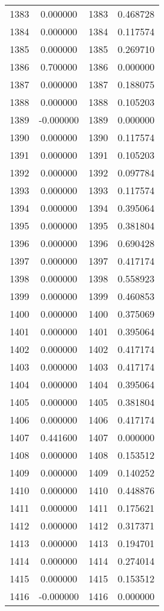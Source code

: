 \documentclass[12pt]{article}
\begin{document}
\begin{longtable}{@{}cccc@{}}
1383 & 0.000000 & 1383 & 0.468728 \\
1384 & 0.000000 & 1384 & 0.117574 \\
1385 & 0.000000 & 1385 & 0.269710 \\
1386 & 0.700000 & 1386 & 0.000000 \\
1387 & 0.000000 & 1387 & 0.188075 \\
1388 & 0.000000 & 1388 & 0.105203 \\
1389 & -0.000000 & 1389 & 0.000000 \\
1390 & 0.000000 & 1390 & 0.117574 \\
1391 & 0.000000 & 1391 & 0.105203 \\
1392 & 0.000000 & 1392 & 0.097784 \\
1393 & 0.000000 & 1393 & 0.117574 \\
1394 & 0.000000 & 1394 & 0.395064 \\
1395 & 0.000000 & 1395 & 0.381804 \\
1396 & 0.000000 & 1396 & 0.690428 \\
1397 & 0.000000 & 1397 & 0.417174 \\
1398 & 0.000000 & 1398 & 0.558923 \\
1399 & 0.000000 & 1399 & 0.460853 \\
1400 & 0.000000 & 1400 & 0.375069 \\
1401 & 0.000000 & 1401 & 0.395064 \\
1402 & 0.000000 & 1402 & 0.417174 \\
1403 & 0.000000 & 1403 & 0.417174 \\
1404 & 0.000000 & 1404 & 0.395064 \\
1405 & 0.000000 & 1405 & 0.381804 \\
1406 & 0.000000 & 1406 & 0.417174 \\
1407 & 0.441600 & 1407 & 0.000000 \\
1408 & 0.000000 & 1408 & 0.153512 \\
1409 & 0.000000 & 1409 & 0.140252 \\
1410 & 0.000000 & 1410 & 0.448876 \\
1411 & 0.000000 & 1411 & 0.175621 \\
1412 & 0.000000 & 1412 & 0.317371 \\
1413 & 0.000000 & 1413 & 0.194701 \\
1414 & 0.000000 & 1414 & 0.274014 \\
1415 & 0.000000 & 1415 & 0.153512 \\
1416 & -0.000000 & 1416 & 0.000000 \\

\end{longtable}
\end{document}
